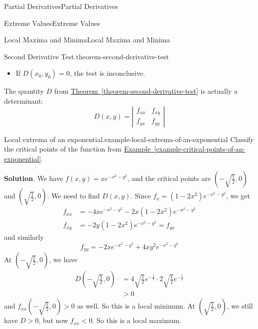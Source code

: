 \documentclass[10pt,]{book}
\numberwithin{equation}{section}
\begin{document}
\begin{chapterptx}{Partial Derivatives}{}{Partial Derivatives}{}{}
\begin{sectionptx}{Extreme Values}{}{Extreme Values}{}{}
\begin{subsectionptx}{Local Maxima and Minima}{}{Local Maxima and Minima}{}{}
\begin{theorem}{Second Derivative Test.}{}{theorem-second-derivative-test}
\begin{itemize}[label=\textbullet]
\item{}If \(D(x_{0},y_{0}) = 0 \), the test is inconclusive.%
\end{itemize}
%
\end{theorem}
\hypertarget{p-1208}{}%
The quantity \(D\) from \hyperref[theorem-second-derivative-test]{Theorem~\ref{theorem-second-derivative-test}} is actually a determinant:%
\begin{equation*}
D(x,y) = \left|\begin{array}{cc} f_{xx} & f_{xy} \\ f_{yx} & f_{yy}\end{array}\right|
\end{equation*}
%
\begin{example}{Local extrema of an exponential.}{example-local-extrema-of-an-exponential}%
\hypertarget{p-1209}{}%
Classify the critical points of the function from \hyperref[example-critical-points-of-an-exponential]{Example~\ref{example-critical-points-of-an-exponential}}.%
\par\smallskip%
\noindent\textbf{Solution}.\hypertarget{solution-190}{}\quad%
\hypertarget{p-1210}{}%
We have \(f(x,y) = xe^{-x^{2} - y^{2}}\), and the critical points are \((-\sqrt{\frac{1}{2}},0)\) and \((\sqrt{\frac{1}{2}},0)\). We need to find \(D(x,y)\). Since \(f_{x} = (1 - 2x^{2})e^{-x^{2} - y^{2}}\), we get%
\begin{align*}
f_{xx} & = -4xe^{-x^{2} - y^{2}} - 2x(1 - 2x^{2})e^{-x^{2} - y^{2}} \\
f_{xy} & = -2y(1-2x^{2})e^{-x^{2} - y^{2}} = f_{yx} 
\end{align*}
and similarly%
\begin{equation*}
f_{yy} = -2xe^{-x^{2} - y^{2}} + 4xy^{2}e^{-x^{2} - y^{2}}
\end{equation*}
At \((-\sqrt{\frac{1}{2}},0)\), we have%
\begin{align*}
D\left(-\sqrt{\frac{1}{2}},0\right) & = 4\sqrt{\frac{1}{2}}e^{-\frac{1}{2}}\cdot2\sqrt{\frac{1}{2}}e^{-\frac{1}{2}}\\
& > 0 
\end{align*}
and \(f_{xx}(-\sqrt{\frac{1}{2}},0) >0\) as well. So this is a local minimum. At \((\sqrt{\frac{1}{2}},0)\), we still have \(D>0\), but now \(f_{xx}<0\). So this is a local maximum.%
\end{example}
\end{subsectionptx}
%
%
\typeout{************************************************}
\typeout{************************************************}

\end{sectionptx}
\end{chapterptx}
\end{document}
